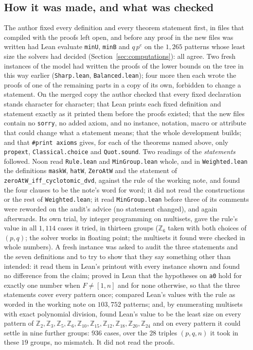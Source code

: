 \documentclass[11pt,a4paper]{amsart}
\theoremstyle{definition}
\theoremstyle{remark}
\newcommand{\Z}{\mathbb{Z}}
\newcommand{\lean}[1]{\texttt{#1}}
\begin{document}
\subsection*{How it was made, and what was checked} The author fixed every definition and every theorem
statement first, in files that compiled with the proofs left open, and before any proof in the new files was written had Lean evaluate \lean{minU}, \lean{minB} and $q\,p^{e}$ on the $1{,}265$ patterns whose least size the solvers had
decided (Section~\ref{sec:computations}): all agree. Two fresh instances of the model had written the proofs of the lower bounds on the tree in this way earlier (\lean{Sharp.lean}, \lean{Balanced.lean}); four more then each wrote the
proofs of one of the remaining parts in a copy of its own, forbidden to change a statement. On the merged copy the author
checked that every fixed declaration stands character for character; that Lean prints each fixed definition
and statement exactly as it printed them before the proofs existed; that the new files contain no
\lean{sorry}, no added axiom, and no instance, notation, macro or attribute that could change what a statement
means; that the whole development builds; and that \lean{\#print axioms} gives, for each of the theorems named
above, only \lean{propext}, \lean{Classical.choice} and \lean{Quot.sound}. Two readings of the \emph{statements} followed. Noon read \lean{Rule.lean} and \lean{MinGroup.lean} whole, and in \lean{Weighted.lean} the definitions
\lean{maskW}, \lean{hatW}, \lean{ZeroAtW} and the statement of \lean{zeroAtW\_iff\_cyclotomic\_dvd},
against the rule of the working note, and found the four clauses to be the note's word for word; it did
not read the constructions or the rest of \lean{Weighted.lean}; it read \lean{MinGroup.lean} before three of its comments were reworded on the audit's advice (no statement changed), and again afterwards. Its own trial, by integer
programming on multisets, gave the rule's value in all $1{,}114$ cases it tried, in thirteen groups ($\Z_6$ taken with both choices of $(p,q)$; the solver works in floating point; the multisets it found were checked in whole numbers). A fresh instance was asked to audit the three statements
and the seven definitions and to try to show that they say something other than intended: it read them in
Lean's printout with every instance shown and found no difference from the claim; proved in Lean that the
hypotheses on \lean{a0} hold for exactly one number when $F\ne[1,n]$ and for none otherwise, so that the three
statements cover every pattern once; compared Lean's values with the rule as worded in the working note on
$103{,}752$ patterns; and, by enumerating multisets with exact polynomial division, found Lean's value to be
the least size on every pattern of $\Z_2,\Z_3,\Z_5,\Z_6,\Z_{10},\Z_{15},\Z_{12},\Z_{18},\Z_{20},\Z_{24}$ and on
every pattern it could settle in nine further groups: $936$ cases, over the $28$ triples $(p,q,n)$ it took in these $19$ groups, no mismatch. It did not read the proofs.
\end{document}
